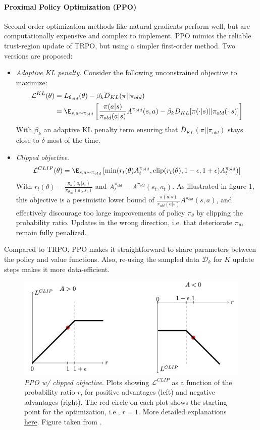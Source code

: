 \paragraph{Proximal Policy Optimization (PPO) \cite{schulman2017proximal}}
Second-order optimization methods like natural gradients perform well, but are computationally expensive and complex to implement. PPO mimics the reliable trust-region update of TRPO, but using a simpler first-order method. Two versions are proposed:
\begin{itemize}
    \item \emph{Adaptive KL penalty}. Consider the following unconstrained objective to maximize:
    \begin{align*}
        \mathcal{L}^{KL}(\theta) 
        &= L_{\theta_{old}}(\theta) - 
        \beta_k \overline{D}_{KL}(\pi||\pi_{old}) \\
        &= \E_{s,a\sim \pi_{old}} \left[
            \frac{\pi(a|s)}{\pi_{old}(a|s)} A^{\pi_{old}}(s,a)
            - \beta_k D_{KL}[\pi(\cdot|s)||\pi_{old}(\cdot|s)]
        \right]
    \end{align*}
    With $\beta_k$ an adaptive KL penalty term ensuring that $\overline{D}_{KL}(\pi||\pi_{old})$ stays close to $\delta$ most of the time.
    \item \emph{Clipped objective}.
    \[
        \mathcal{L}^{CLIP}(\theta) 
        = \E_{s,a\sim \pi_{old}} \left[
            \min(r_t(\theta) A^{\pi_{old}}_t, \text{clip}(r_t(\theta), 1-\epsilon, 1+\epsilon) A^{\pi_{old}}_t)
        \right]
    \]
    With $r_t(\theta) = \frac{\pi_\theta(a_t|s_t)}{\pi_{\theta_{old}}(a_t,s_t)}$ and $A^{\pi_{old}}_t = A^{\pi_{old}}(s_t,a_t)$. As illustrated in figure \ref{fig:ppo-clip}, this objective is a pessimistic lower bound of $\frac{\pi(a|s)}{\pi_{old}(a|s)} A^{\pi_{old}}(s,a)$, and effectively discourage too large improvements of policy $\pi_\theta$ by clipping the probability ratio. Updates in the wrong direction, i.e. that deteriorate $\pi_\theta$, remain fully penalized. 
\end{itemize}
Compared to TRPO, PPO makes it straightforward to share parameters between the policy and value functions. Also, re-using the sampled data $\mathcal{D}_k$ for $K$ update steps makes it more data-efficient.

\begin{figure}
    \centering
    \includegraphics[width=0.5\linewidth]{figures/ppo-clip.png}
    \caption{\emph{PPO w/ clipped objective}. Plots showing $\mathcal{L}^{CLIP}$ as a function of the probability ratio $r$, for positive advantages (left) and negative advantages (right). The red circle on each plot shows the starting point for the optimization, i.e., $r=1$. More detailed explanations \href{https://stackoverflow.com/a/50663200}{here}. Figure taken from \cite{schulman2017proximal}.}
    \label{fig:ppo-clip}
\end{figure}

